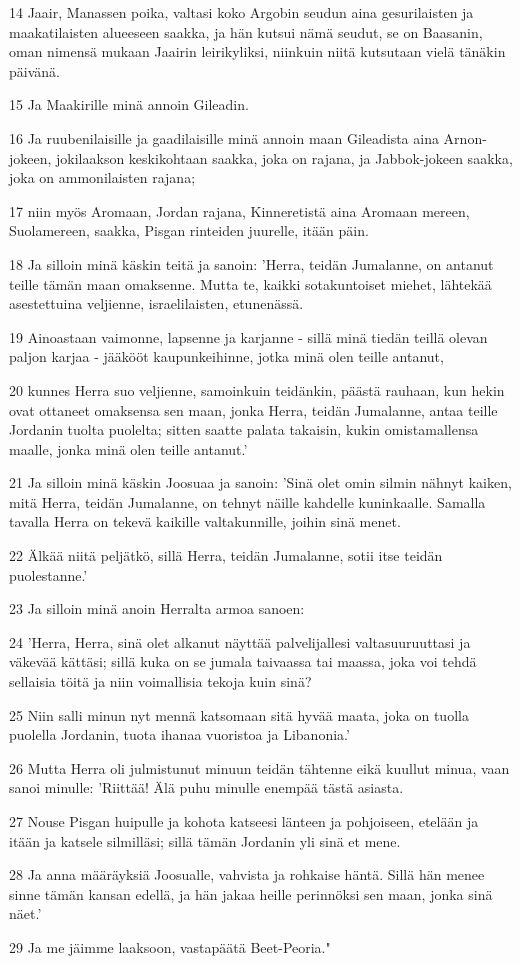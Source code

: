 \par 14 Jaair, Manassen poika, valtasi koko Argobin seudun aina gesurilaisten ja maakatilaisten alueeseen saakka, ja hän kutsui nämä seudut, se on Baasanin, oman nimensä mukaan Jaairin leirikyliksi, niinkuin niitä kutsutaan vielä tänäkin päivänä.
\par 15 Ja Maakirille minä annoin Gileadin.
\par 16 Ja ruubenilaisille ja gaadilaisille minä annoin maan Gileadista aina Arnon-jokeen, jokilaakson keskikohtaan saakka, joka on rajana, ja Jabbok-jokeen saakka, joka on ammonilaisten rajana;
\par 17 niin myös Aromaan, Jordan rajana, Kinneretistä aina Aromaan mereen, Suolamereen, saakka, Pisgan rinteiden juurelle, itään päin.
\par 18 Ja silloin minä käskin teitä ja sanoin: 'Herra, teidän Jumalanne, on antanut teille tämän maan omaksenne. Mutta te, kaikki sotakuntoiset miehet, lähtekää asestettuina veljienne, israelilaisten, etunenässä.
\par 19 Ainoastaan vaimonne, lapsenne ja karjanne - sillä minä tiedän teillä olevan paljon karjaa - jääkööt kaupunkeihinne, jotka minä olen teille antanut,
\par 20 kunnes Herra suo veljienne, samoinkuin teidänkin, päästä rauhaan, kun hekin ovat ottaneet omaksensa sen maan, jonka Herra, teidän Jumalanne, antaa teille Jordanin tuolta puolelta; sitten saatte palata takaisin, kukin omistamallensa maalle, jonka minä olen teille antanut.'
\par 21 Ja silloin minä käskin Joosuaa ja sanoin: 'Sinä olet omin silmin nähnyt kaiken, mitä Herra, teidän Jumalanne, on tehnyt näille kahdelle kuninkaalle. Samalla tavalla Herra on tekevä kaikille valtakunnille, joihin sinä menet.
\par 22 Älkää niitä peljätkö, sillä Herra, teidän Jumalanne, sotii itse teidän puolestanne.'
\par 23 Ja silloin minä anoin Herralta armoa sanoen:
\par 24 'Herra, Herra, sinä olet alkanut näyttää palvelijallesi valtasuuruuttasi ja väkevää kättäsi; sillä kuka on se jumala taivaassa tai maassa, joka voi tehdä sellaisia töitä ja niin voimallisia tekoja kuin sinä?
\par 25 Niin salli minun nyt mennä katsomaan sitä hyvää maata, joka on tuolla puolella Jordanin, tuota ihanaa vuoristoa ja Libanonia.'
\par 26 Mutta Herra oli julmistunut minuun teidän tähtenne eikä kuullut minua, vaan sanoi minulle: 'Riittää! Älä puhu minulle enempää tästä asiasta.
\par 27 Nouse Pisgan huipulle ja kohota katseesi länteen ja pohjoiseen, etelään ja itään ja katsele silmilläsi; sillä tämän Jordanin yli sinä et mene.
\par 28 Ja anna määräyksiä Joosualle, vahvista ja rohkaise häntä. Sillä hän menee sinne tämän kansan edellä, ja hän jakaa heille perinnöksi sen maan, jonka sinä näet.'
\par 29 Ja me jäimme laaksoon, vastapäätä Beet-Peoria."

